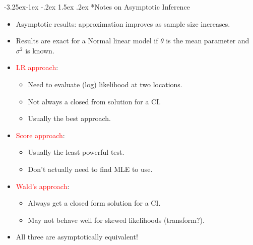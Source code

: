\documentclass[final]{article}\usepackage[]{graphicx}\usepackage[svgnames]{xcolor}
\makeatletter
\renewcommand\subsection{\@startsection{subsection}{2}{\z@}%
                                     {-3.25ex\@plus -1ex \@minus -.2ex}%
                                     {1.5ex \@plus .2ex}%
                                     {\normalfont\large\bfseries\scshape\color{Blue}}}
\makeatother
\begin{document}
\subsection*{Notes on Asymptotic Inference}
\begin{itemize}
      \item Asymptotic results: approximation improves as sample size increases.
      \item Results are exact for a Normal linear model if $ \theta $ is the mean parameter and $ \sigma^2 $ is
            known.
      \item \textcolor{Red}{LR approach}:
            \begin{itemize}
                  \item Need to evaluate (log) likelihood at two locations.
                  \item Not always a closed from solution for a CI.
                  \item Usually the best approach.
            \end{itemize}
      \item \textcolor{Red}{Score approach}:
            \begin{itemize}
                  \item Usually the least powerful test.
                  \item Don't actually need to find MLE to use.
            \end{itemize}
      \item \textcolor{Red}{Wald's approach}:
            \begin{itemize}
                  \item Always get a closed form solution for a CI.
                  \item May not behave well for skewed likelihoods (transform?).
            \end{itemize}
      \item All three are asymptotically equivalent!
\end{itemize}
\end{document}
